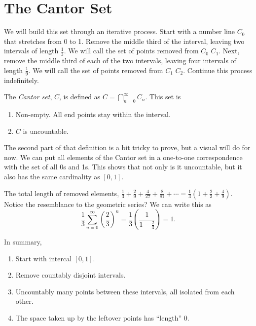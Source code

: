 \renewcommand{\theenumi}{\arabic{enumi}}
\renewcommand{\labelenumi}{\theenumi.}
\section{The Cantor Set}

We will build this set through an iterative process. Start with a number line \(C_0\) that stretches from 0 to 1. Remove the middle third of the interval, leaving two intervals of length \(\frac{1}{3}\). We will call the set of points removed from \(C_0\) \(C_1\). Next, remove the middle third of each of the two intervals, leaving four intervals of length \(\frac{1}{9}\). We will call the set of points removed from \(C_1\) \(C_2\). Continue this process indefinitely. 


\begin{definition}
    The \textit{Cantor set}, \(C\), is defined as \(C = \bigcap_{n=0}^\infty C_n\). This set is 
    \begin{enumerate}
        \item Non-empty. All end points stay within the interval.
        \item \(C\) is uncountable.
    \end{enumerate}
\end{definition}

The second part of that definition is a bit tricky to prove, but a visual will do for now. We can put all elements of the Cantor set in a one-to-one correspondence with the set of all 0s and 1s. This shows that not only is it uncountable, but it also has the same cardinality as \([0,1]\). %

The total length of removed elements, \(\frac{1}{3} + \frac{2}{9} + \frac{4}{27} + \frac{8}{81} + \cdots = \frac{1}{3}(1 + \frac{2}{3} + \frac{4}{9})\). Notice the resemblance to the geometric series? We can write this as \[\frac{1}{3} \sum_{n=0}^\infty \left(\frac{2}{3}\right)^n = \frac{1}{3} \left(\frac{1}{1 - \frac{2}{3}}\right) = 1.\] 

In summary, \begin{enumerate}
    \item Start with intercal \([0,1]\).
    \item Remove countably disjoint intervals.
    \item Uncountably many points between these intervals, all isolated from each other.
    \item The space taken up by the leftover points has ``length'' 0.
\end{enumerate}


